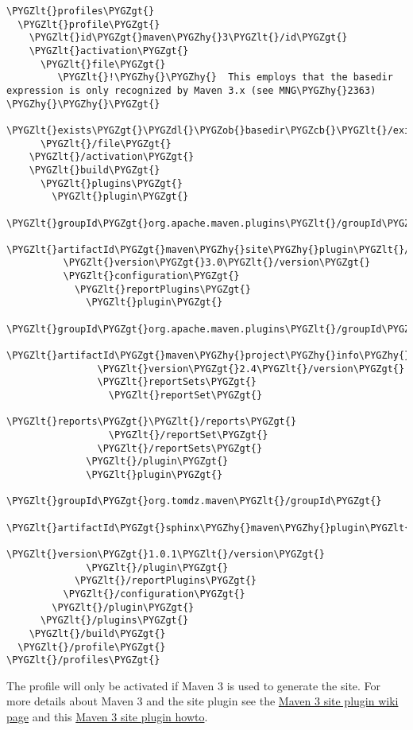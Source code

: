 \documentclass[letterpaper,10pt,english]{sphinxmanual}
\def\PYGZob{\char`\{}
\def\PYGZcb{\char`\}}
\def\PYGZlt{\char`\<}
\def\PYGZgt{\char`\>}
\def\PYGZdl{\char`\$}
\def\PYGZhy{\char`\-}
\begin{document}
\begin{Verbatim}[commandchars=\\\{\}]
\PYGZlt{}profiles\PYGZgt{}
  \PYGZlt{}profile\PYGZgt{}
    \PYGZlt{}id\PYGZgt{}maven\PYGZhy{}3\PYGZlt{}/id\PYGZgt{}
    \PYGZlt{}activation\PYGZgt{}
      \PYGZlt{}file\PYGZgt{}
         \PYGZlt{}!\PYGZhy{}\PYGZhy{}  This employs that the basedir expression is only recognized by Maven 3.x (see MNG\PYGZhy{}2363) \PYGZhy{}\PYGZhy{}\PYGZgt{}
        \PYGZlt{}exists\PYGZgt{}\PYGZdl{}\PYGZob{}basedir\PYGZcb{}\PYGZlt{}/exists\PYGZgt{}
      \PYGZlt{}/file\PYGZgt{}
    \PYGZlt{}/activation\PYGZgt{}
    \PYGZlt{}build\PYGZgt{}
      \PYGZlt{}plugins\PYGZgt{}
        \PYGZlt{}plugin\PYGZgt{}
          \PYGZlt{}groupId\PYGZgt{}org.apache.maven.plugins\PYGZlt{}/groupId\PYGZgt{}
          \PYGZlt{}artifactId\PYGZgt{}maven\PYGZhy{}site\PYGZhy{}plugin\PYGZlt{}/artifactId\PYGZgt{}
          \PYGZlt{}version\PYGZgt{}3.0\PYGZlt{}/version\PYGZgt{}
          \PYGZlt{}configuration\PYGZgt{}
            \PYGZlt{}reportPlugins\PYGZgt{}
              \PYGZlt{}plugin\PYGZgt{}
                \PYGZlt{}groupId\PYGZgt{}org.apache.maven.plugins\PYGZlt{}/groupId\PYGZgt{}
                \PYGZlt{}artifactId\PYGZgt{}maven\PYGZhy{}project\PYGZhy{}info\PYGZhy{}reports\PYGZhy{}plugin\PYGZlt{}/artifactId\PYGZgt{}
                \PYGZlt{}version\PYGZgt{}2.4\PYGZlt{}/version\PYGZgt{}
                \PYGZlt{}reportSets\PYGZgt{}
                  \PYGZlt{}reportSet\PYGZgt{}
                    \PYGZlt{}reports\PYGZgt{}\PYGZlt{}/reports\PYGZgt{}
                  \PYGZlt{}/reportSet\PYGZgt{}
                \PYGZlt{}/reportSets\PYGZgt{}
              \PYGZlt{}/plugin\PYGZgt{}
              \PYGZlt{}plugin\PYGZgt{}
                \PYGZlt{}groupId\PYGZgt{}org.tomdz.maven\PYGZlt{}/groupId\PYGZgt{}
                \PYGZlt{}artifactId\PYGZgt{}sphinx\PYGZhy{}maven\PYGZhy{}plugin\PYGZlt{}/artifactId\PYGZgt{}
                \PYGZlt{}version\PYGZgt{}1.0.1\PYGZlt{}/version\PYGZgt{}
              \PYGZlt{}/plugin\PYGZgt{}
            \PYGZlt{}/reportPlugins\PYGZgt{}
          \PYGZlt{}/configuration\PYGZgt{}
        \PYGZlt{}/plugin\PYGZgt{}
      \PYGZlt{}/plugins\PYGZgt{}
    \PYGZlt{}/build\PYGZgt{}
  \PYGZlt{}/profile\PYGZgt{}
\PYGZlt{}/profiles\PYGZgt{}
\end{Verbatim}

The profile will only be activated if Maven 3 is used to generate the site. For more details about Maven 3
and the site plugin see the \href{https://cwiki.apache.org/MAVEN/maven-3x-and-site-plugin.html}{Maven 3 site plugin wiki page} and this \href{http://whatiscomingtomyhead.wordpress.com/2011/06/05/maven-3-site-plugin-how-to/}{Maven 3 site plugin howto}.
\end{document}
